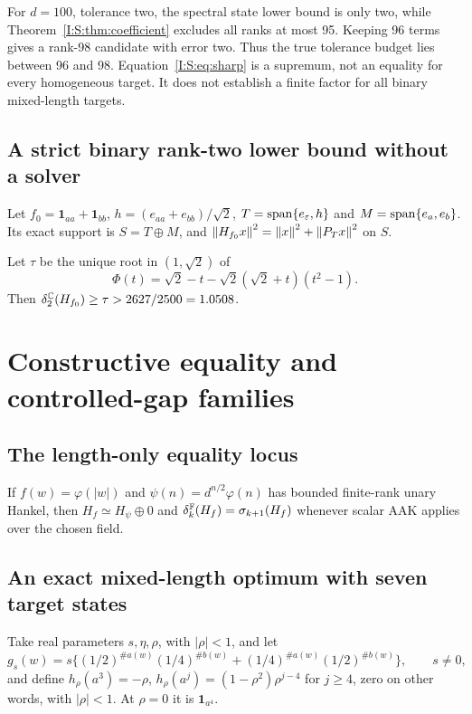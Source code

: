 For $d=100$, tolerance two, the spectral state lower bound is only two, while Theorem~\ref{I:S:thm:coefficient} excludes all ranks at most 95. Keeping 96 terms gives a rank-98 candidate with error two. Thus the true tolerance budget lies between 96 and 98. Equation~\eqref{I:S:eq:sharp} is a supremum, not an equality for every homogeneous target. It does not establish a finite factor for all binary mixed-length targets.

\subsection{A strict binary rank-two lower bound without a solver}
Let $f_0=\mathbf1_{aa}+\mathbf1_{bb}$, $h=(e_{aa}+e_{bb})/\sqrt2$, $T=\operatorname{span}\{e_\varepsilon,h\}$ and $M=\operatorname{span}\{e_a,e_b\}$. Its exact support is $S=T\oplus M$, and
$\left\lVert H_{f_0}x\right\rVert^2=\left\lVert x\right\rVert^2+\left\lVert P_Tx\right\rVert^2$ on $S$.

\begin{proposition}\label{I:S:prop:binary}
Let $\tau$ be the unique root in $(1,\sqrt2)$ of
\[
 \Phi(t)=\sqrt2-t-\sqrt2(\sqrt2+t)(t^2-1).
\]
Then $\delta_2^\mathbb C(H_{f_0})\ge\tau>2627/2500=1.0508$.
\end{proposition}


\section{Constructive equality and controlled-gap families}\label{I:S:sec:constructive}
\subsection{The length-only equality locus}
\begin{proposition}\label{I:S:prop:radial}
If $f(w)=\varphi(|w|)$ and $\psi(n)=d^{n/2}\varphi(n)$ has bounded finite-rank unary Hankel, then
$H_f\simeq H_\psi\oplus0$ and $\delta_{k}^{\mathbb F}(H_f)=\sigma_{k+1}(H_f)$ whenever scalar AAK applies over the chosen field.
\end{proposition}


\subsection{An exact mixed-length optimum with seven target states}
Take real parameters $s,\eta,\rho$, with $|\rho|<1$, and let
\[
 g_s(w)=s\{(1/2)^{\#a(w)}(1/4)^{\#b(w)}
             +(1/4)^{\#a(w)}(1/2)^{\#b(w)}\},\qquad s\ne0,
\]
and define $h_\rho(a^3)=-\rho$, $h_\rho(a^j)=(1-\rho^2)\rho^{j-4}$ for $j\ge4$, zero on other words, with $|\rho|<1$. At $\rho=0$ it is $\mathbf1_{a^4}$.

